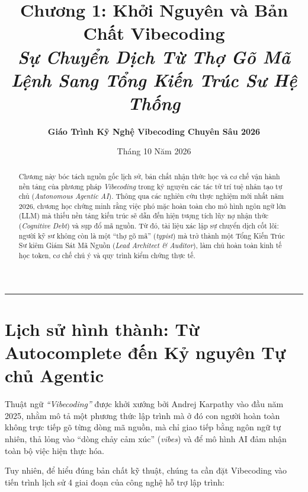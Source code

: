 \documentclass[a4paper,11pt]{article}
\title{\textbf{Chương 1: Khởi Nguyên và Bản Chất Vibecoding}\\[0.3em]
\large\textit{Sự Chuyển Dịch Từ Thợ Gõ Mã Lệnh Sang Tổng Kiến Trúc Sư Hệ Thống}}
\author{\textbf{Giáo Trình Kỹ Nghệ Vibecoding Chuyên Sâu 2026}}
\date{Tháng 10 Năm 2026}
\begin{document}
\maketitle

\begin{abstract}
Chương này bóc tách nguồn gốc lịch sử, bản chất nhận thức học và cơ chế vận hành nền tảng của phương pháp \textit{Vibecoding} trong kỷ nguyên các tác tử trí tuệ nhân tạo tự chủ (\textit{Autonomous Agentic AI}). Thông qua các nghiên cứu thực nghiệm mới nhất năm 2026, chương học chứng minh rằng việc phó mặc hoàn toàn cho mô hình ngôn ngữ lớn (LLM) mà thiếu nền tảng kiến trúc sẽ dẫn đến hiện tượng tích lũy nợ nhận thức (\textit{Cognitive Debt}) và sụp đổ mã nguồn. Từ đó, tài liệu xác lập sự chuyển dịch cốt lõi: người kỹ sư không còn là một ``thợ gõ mã'' (\textit{typist}) mà trở thành một Tổng Kiến Trúc Sư kiêm Giám Sát Mã Nguồn (\textit{Lead Architect \& Auditor}), làm chủ hoàn toàn kinh tế học token, cơ chế chú ý và quy trình kiểm chứng thực tế.
\end{abstract}

\vspace{1em}
\rule{\textwidth}{0.4pt}

\section{Lịch sử hình thành: Từ Autocomplete đến Kỷ nguyên Tự chủ Agentic}

Thuật ngữ \textit{``Vibecoding''} được khởi xướng bởi Andrej Karpathy vào đầu năm 2025, nhằm mô tả một phương thức lập trình mà ở đó con người hoàn toàn không trực tiếp gõ từng dòng mã nguồn, mà chỉ giao tiếp bằng ngôn ngữ tự nhiên, thả lỏng vào ``dòng chảy cảm xúc'' (\textit{vibes}) và để mô hình AI đảm nhận toàn bộ việc hiện thực hóa. 

Tuy nhiên, để hiểu đúng bản chất kỹ thuật, chúng ta cần đặt Vibecoding vào tiến trình lịch sử 4 giai đoạn của công nghệ hỗ trợ lập trình:
\end{document}
